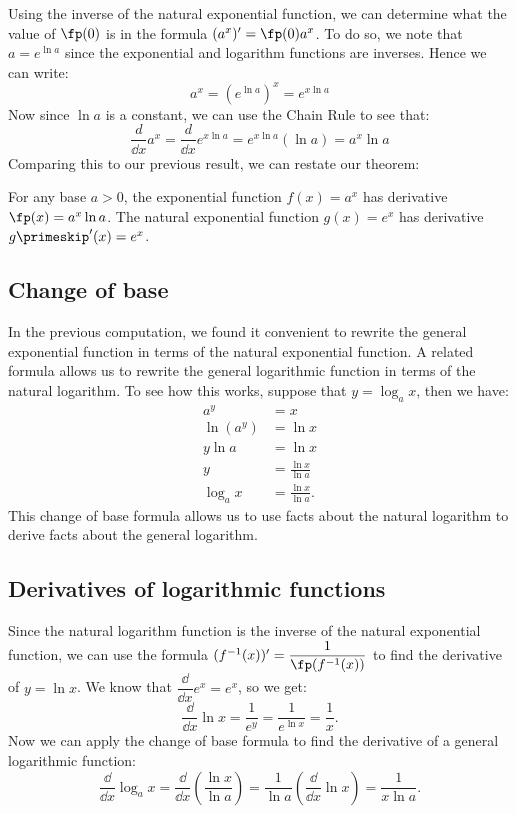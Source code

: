 Using the inverse of the natural exponential function, we can determine what the value of $\fp(0)$ is in the formula $(a^x)'=\fp(0)a^x$. To do so, we note that $a=e^{\ln a}$ since the exponential and logarithm functions are inverses. Hence we can write:
\[a^x=\left(e^{\ln a}\right)^x=e^{x\ln a}\]
Now since $\ln a$ is a constant, we can use the Chain Rule to see that:
\[\frac d{\dd x} a^x=\frac d{\dd x} e^{x\ln a} =e^{x\ln a}(\ln a) =a^x\ln a\]
Comparing this to our previous result, we can restate our theorem:

\begin{theorem}\label{thm_exp_deriv}%
For any base $a>0$, the exponential function $f(x)=a^x$ has derivative $\fp(x)=a^x\ln a$. The natural exponential function $g(x)=e^x$ has derivative $g\primeskip'(x)=e^x$.
\end{theorem}

\subsection{Change of base}

In the previous computation, we found it convenient to rewrite the general exponential function in terms of the natural exponential function. A related formula allows us to rewrite the general logarithmic function in terms of the natural logarithm.  To see how this works, suppose that $y=\log_ax$, then we have:
\begin{align*}
a^y&=x \\
\ln(a^y)&=\ln x\\
y\ln a&=\ln x\\
y&=\frac{\ln x}{\ln a}\\
\log_a x&=\frac{\ln x}{\ln a}.
\end{align*}
This change of base formula allows us to use facts about the natural logarithm to derive facts about the general logarithm.

\subsection{Derivatives of logarithmic functions}

Since the natural logarithm function is the inverse of the natural exponential function, we can use the formula $(f^{-1}(x))'=\dfrac1{\fp(f^{-1}(x))}$ to find the derivative of $y=\ln x$. We know that $\dfrac\dd{\dd x}e^x=e^x$, so we get:
\[\frac\dd{\dd x}\ln x=\frac1{e^y}=\frac1{e^{\ln x}}=\frac1x.\]
Now we
can apply the change of base formula to find the derivative of a general logarithmic function:
\[\frac{\dd}{\dd x}\log_ax=\frac{\dd}{\dd x}\left(\frac{\ln x}{\ln a}\right) =\frac 1{\ln a}\left(\frac{\dd}{\dd x}\ln x\right)=\frac 1{x\ln a}.\]

